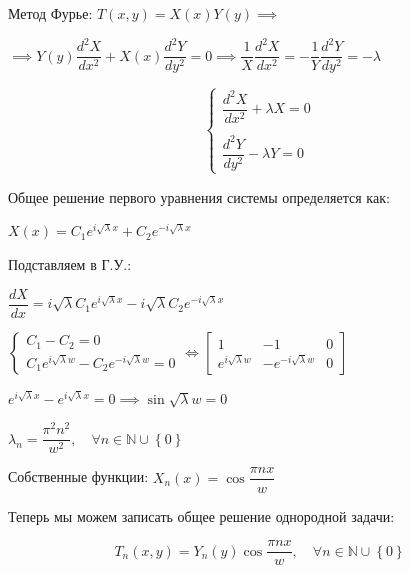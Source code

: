 \documentclass[a4paper,12pt]{article}
\begin{document}
	\quad Метод Фурье: $T(x, y) = X(x) Y(y) \implies $
	
	\begin{center}
		$\implies Y(y) \dfrac{d^2 X}{dx^2} + X(x) \dfrac{d^2 Y}{dy^2} = 0 \implies \dfrac{1}{X} \dfrac{d^2 X}{dx^2} = -\dfrac{1}{Y} \dfrac{d^2 Y}{dy^2} = -\lambda $
	\end{center}
	
	\begin{equation}
		\begin{cases}
			\dfrac{d^2 X}{dx^2} + \lambda X = 0 \\
			\\
			\dfrac{d^2 Y}{dy^2} - \lambda Y= 0 
 		\end{cases}
	\end{equation}
	   
	\quad Общее решение первого уравнения системы определяется как:   
	
	\begin{center}
		$X(x) = C_1 e^{i\sqrt{\lambda} x} + C_2 e^{-i\sqrt{\lambda} x} $
	\end{center} 
	
	\quad Подставляем в Г.У.: 
	
	\begin{center}
		$\dfrac{dX}{dx} = i\sqrt{\lambda}C_1e^{i\sqrt{\lambda} x} - i\sqrt{\lambda} C_2 e^{-i\sqrt{\lambda} x} $
		
		$\begin{cases}
			C_1 - C_2 = 0 \\
			C_1 e^{i\sqrt{\lambda} w} - C_2 e^{-i\sqrt{\lambda} w} = 0
		\end{cases} \Leftrightarrow \left[\begin{array}{cc|c}
		1 & -1 & 0 \\
		e^{i\sqrt{\lambda} w} & -e^{-i\sqrt{\lambda} w} & 0
		\end{array} \right]$
		
		$ e^{i\sqrt{\lambda} x} - e^{i\sqrt{\lambda} x} = 0 \implies \sin{\sqrt{\lambda}w} = 0 $
		
		$\lambda_n = \dfrac{\pi^2 n^2}{w^2}, \quad \forall n \in \mathbb{N}\cup\left\{ 0 \right\} $ 
		
		Собственные функции: $X_n (x) = \cos{\dfrac{\pi n x}{w}}$ 
	\end{center}
	
	\quad Теперь мы можем записать общее решение однородной задачи:
	
	\begin{equation}
		T_n (x, y) = Y_n (y) \cos{\dfrac{\pi n x}{w}},\quad \forall n \in \mathbb{N}\cup\left\{ 0 \right\} 
 	\end{equation}
	  
\end{document}

